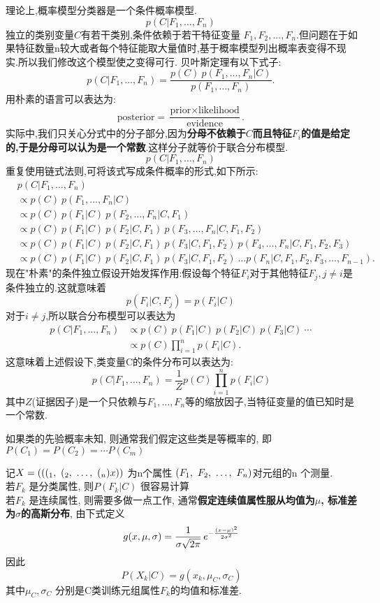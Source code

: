 \documentclass{article}
\begin{document}
理论上,概率模型分类器是一个条件概率模型.
$$ p(C \vert F_1,\dots,F_n)\, $$
独立的类别变量$C$有若干类别,条件依赖于若干特征变量 $F_1,F_2,...,F_n$.但问题在于如果特征数量n较大或者每个特征能取大量值时,基于概率模型列出概率表变得不现实.所以我们修改这个模型使之变得可行. 贝叶斯定理有以下式子:
$$ p(C \vert F_1,\dots,F_n) = \frac{p(C) \ p(F_1,\dots,F_n\vert C)}{p(F_1,\dots,F_n)}. \, $$
用朴素的语言可以表达为:
$$ \mbox{posterior} = \frac{\mbox{prior} \times \mbox{likelihood}}{\mbox{evidence}}.  \, $$
实际中,我们只关心分式中的分子部分,因为\textbf{分母不依赖于$C$而且特征$F_i$的值是给定的,于是分母可以认为是一个常数}.这样分子就等价于联合分布模型.
$$ p(C \vert F_1, \dots, F_n)\, $$
重复使用链式法则,可将该式写成条件概率的形式,如下所示:
$$
\begin{aligned}
& p(C \vert F_1, \dots, F_n)\,\\
& \varpropto p(C) \ p(F_1,\dots,F_n\vert C)\\
& \varpropto p(C) \ p(F_1\vert C) \ p(F_2,\dots,F_n\vert C, F_1)\\
& \varpropto p(C) \ p(F_1\vert C) \ p(F_2\vert C, F_1) \ p(F_3,\dots,F_n\vert C, F_1, F_2)\\
& \varpropto p(C) \ p(F_1\vert C) \ p(F_2\vert C, F_1) \ p(F_3\vert C, F_1, F_2) \ p(F_4,\dots,F_n\vert C, F_1, F_2, F_3)\\
& \varpropto p(C) \ p(F_1\vert C) \ p(F_2\vert C, F_1) \ p(F_3\vert C, F_1, F_2) \ \dots p(F_n\vert C, F_1, F_2, F_3,\dots,F_{n-1}).
\end{aligned}
$$
现在"朴素"的条件独立假设开始发挥作用:假设每个特征$F_i$对于其他特征$F_j,j\neq i$是条件独立的.这就意味着
$$ p(F_i \vert C, F_j) = p(F_i \vert C)\, $$
对于$i\ne j$,所以联合分布模型可以表达为
$$
\begin{aligned}
p(C \vert F_1, \dots, F_n) 
& \varpropto p(C) \ p(F_1\vert C) \ p(F_2\vert C) \ p(F_3\vert C) \ \cdots\, \\
& \varpropto p(C) \prod_{i=1}^n p(F_i \vert C).\,
\end{aligned}
$$
这意味着上述假设下,类变量C的条件分布可以表达为:
$$ p(C \vert F_1,\dots,F_n) = \frac{1}{Z}  p(C) \prod_{i=1}^n p(F_i \vert C) $$
其中$Z$(证据因子)是一个只依赖与$F_1,\dots,F_n$等的缩放因子,当特征变量的值已知时是一个常数.

如果类的先验概率未知, 则通常我们假定这些类是等概率的, 即
$ P(C_1)= P(C_2)= \cdots P(C_m) $

记$X = (((_1,~(_2,~\ldots,~(_n)x))$ 为n个属性 $(F_1,~F_2,~\ldots,~F_n)$对元组的n 个测量.\\
若$F_k$ 是分类属性, 则$P(F_k \vert C)$ 很容易计算\\
若$F_k$ 是连续属性, 则需要多做一点工作, 通常\textbf{假定连续值属性服从均值为$\mu$, 标准差为$\sigma$的高斯分布}, 由下式定义
$$ g(x,\mu, \sigma) = {1 \over \sigma\sqrt{2\pi} }\,e^{- {{(x-\mu )^2 \over 2\sigma^2}}} $$
因此
$$ P(X_k \vert C) = g(x_k, \mu_C, \sigma_C) $$
其中$\mu_C, \sigma_C$ 分别是C类训练元组属性$F_k$的均值和标准差.
\end{document}
